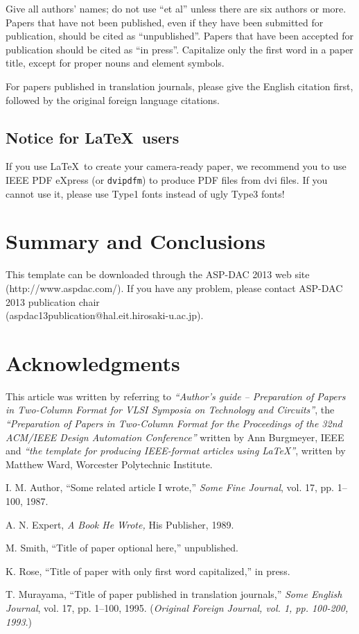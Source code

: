 \documentclass[twocolumn,letterpaper]{article}
\begin{document}
Give all authors' names; do not use ``et al'' unless there are six
authors or more. Papers that have not been published, even if they have
been submitted for publication, should be cited as
``unpublished''\cite{unpub}.  Papers that have been accepted for
publication should be cited as ``in press''\cite{inpress}.
Capitalize only the first word in a paper title, except for proper nouns
and element symbols.

For papers published in translation journals, please give the English
citation first, followed by the original foreign language
citations\cite{trans}.

\subsection{Notice for \LaTeX\ users}

If you use \LaTeX\ to create your camera-ready paper, we recommend you
to use IEEE PDF eXpress (or \texttt{dvipdfm}) to produce PDF files from dvi 
files. If you cannot use it, please use Type1 fonts instead of ugly Type3 fonts!

\section{Summary and Conclusions}

This template can be downloaded through the ASP-DAC 2013 web site
(http://www.aspdac.com/). If you have any problem, please contact ASP-DAC
2013 publication chair\\
(aspdac13publication@hal.eit.hirosaki-u.ac.jp).

\section*{\sc Acknowledgments}
This article was written by referring to {\em ``Author's guide --
Preparation of Papers in Two-Column Format for VLSI Symposia on
Technology and Circuits''}, the {\em ``Preparation of Papers in
Two-Column Format for the Proceedings of the 32nd ACM/IEEE Design
Automation Conference''} written by Ann Burgmeyer, IEEE and {\em ``the
template for producing IEEE-format articles using \LaTeX''}, written by
Matthew Ward, Worcester Polytechnic Institute.

\begin{thebibliography}{9}
\footnotesize
{}
I. M. Author,
``Some related article I wrote,''
{\em Some Fine Journal}, vol. 17, pp. 1--100, 1987.

A. N. Expert,
{\em A Book He Wrote,}
His Publisher, 1989.

M. Smith,
``Title of paper optional here,''
unpublished.

K. Rose,
``Title of paper with only first word capitalized,''	%
in press.

T. Murayama,
``Title of paper published in translation journals,''	%
{\em Some English Journal}, vol. 17, pp. 1--100, 1995.	%
({\em Original Foreign Journal, vol. 1, pp. 100-200, 1993}.)	%

\end{thebibliography}
\end{document}
